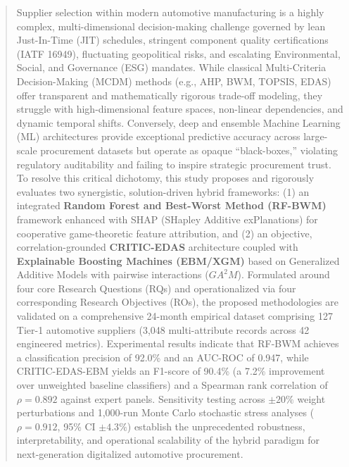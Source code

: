 \documentclass[twocolumn,10pt]{article}
\begin{document}
\begin{abstract}
\noindent Supplier selection within modern automotive manufacturing is a highly complex, multi-dimensional decision-making challenge governed by lean Just-In-Time (JIT) schedules, stringent component quality certifications (IATF 16949), fluctuating geopolitical risks, and escalating Environmental, Social, and Governance (ESG) mandates. While classical Multi-Criteria Decision-Making (MCDM) methods (e.g., AHP, BWM, TOPSIS, EDAS) offer transparent and mathematically rigorous trade-off modeling, they struggle with high-dimensional feature spaces, non-linear dependencies, and dynamic temporal shifts. Conversely, deep and ensemble Machine Learning (ML) architectures provide exceptional predictive accuracy across large-scale procurement datasets but operate as opaque ``black-boxes,'' violating regulatory auditability and failing to inspire strategic procurement trust. To resolve this critical dichotomy, this study proposes and rigorously evaluates two synergistic, solution-driven hybrid frameworks: (1) an integrated \textbf{Random Forest and Best-Worst Method (RF-BWM)} framework enhanced with SHAP (SHapley Additive exPlanations) for cooperative game-theoretic feature attribution, and (2) an objective, correlation-grounded \textbf{CRITIC-EDAS} architecture coupled with \textbf{Explainable Boosting Machines (EBM/XGM)} based on Generalized Additive Models with pairwise interactions ($GA^2M$). Formulated around four core Research Questions (RQs) and operationalized via four corresponding Research Objectives (ROs), the proposed methodologies are validated on a comprehensive 24-month empirical dataset comprising 127 Tier-1 automotive suppliers (3,048 multi-attribute records across 42 engineered metrics). Experimental results indicate that RF-BWM achieves a classification precision of 92.0\% and an AUC-ROC of 0.947, while CRITIC-EDAS-EBM yields an F1-score of 90.4\% (a 7.2\% improvement over unweighted baseline classifiers) and a Spearman rank correlation of $\rho = 0.892$ against expert panels. Sensitivity testing across $\pm 20\%$ weight perturbations and 1,000-run Monte Carlo stochastic stress analyses ($\rho = 0.912$, 95\% CI $\pm 4.3\%$) establish the unprecedented robustness, interpretability, and operational scalability of the hybrid paradigm for next-generation digitalized automotive procurement.
\end{abstract}
\end{document}
